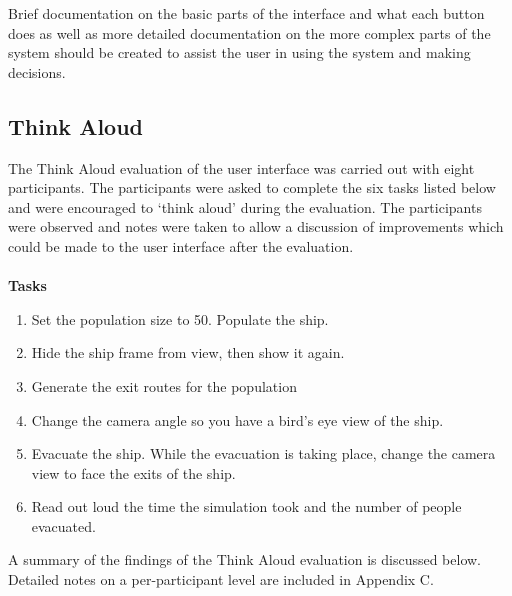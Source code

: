 \documentclass{article}
\begin{document}
Brief documentation on the basic parts of the interface and what each button does as well as more detailed documentation on the more complex parts of the system should be created to assist the user in using the system and making decisions.

\subsection{Think Aloud}
The Think Aloud evaluation of the user interface was carried out with eight participants. The participants were asked to complete the six tasks listed below and were encouraged to ‘think aloud’ during the evaluation. The participants were observed and notes were taken to allow a discussion of improvements which could be made to the user interface after the evaluation.
\\
\\
\textbf{Tasks}
\begin{enumerate}
\item Set the population size to 50. Populate the ship.
\item Hide the ship frame from view, then show it again.
\item Generate the exit routes for the population
\item Change the camera angle so you have a bird’s eye view of the ship.
\item Evacuate the ship. While the evacuation is taking place, change the camera view to face the exits of the ship.
\item Read out loud the time the simulation took and the number of people evacuated.
\end{enumerate}
A summary of the findings of the Think Aloud evaluation is discussed below. Detailed notes on a per-participant level are included in Appendix C.
\end{document}
